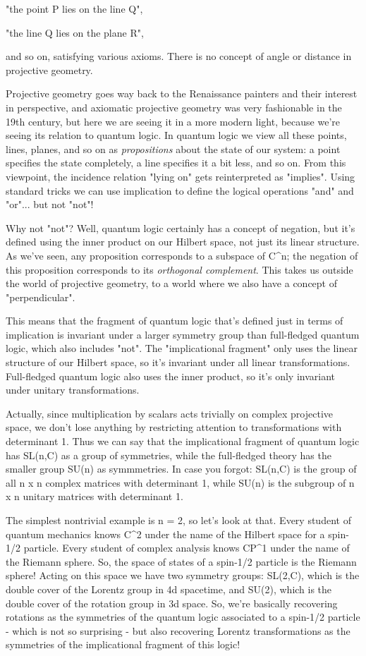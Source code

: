 "the point P lies on the line Q", 

"the line Q lies on the plane R", 

and so on, satisfying various axioms.  There is no concept of angle or
distance in projective geometry.

Projective geometry goes way back to the Renaissance painters and their
interest in perspective, and axiomatic projective geometry was very
fashionable in the 19th century, but here we are seeing it in a more
modern light, because we're seeing its relation to quantum logic.  In
quantum logic we view all these points, lines, planes, and so on as
\emph{propositions} about the state of our system: a point specifies the
state completely, a line specifies it a bit less, and so on.  From this
viewpoint, the incidence relation "lying on" gets
reinterpreted as "implies".  Using standard tricks we can use
implication to define the logical operations "and" and
"or"... but not "not"!


Why not "not"?  Well, quantum logic certainly has a concept of
negation, but it's defined using the inner product on our Hilbert space,
not just its linear structure.  As we've seen, any proposition
corresponds to a subspace of C^{n}; the negation of this
proposition corresponds to its \emph{orthogonal complement}.  This
takes us outside the world of projective geometry, to a world where we
also have a concept of "perpendicular".

This means that the fragment of quantum logic that's defined just in
terms of implication is invariant under a larger symmetry group than
full-fledged quantum logic, which also includes "not".  The
"implicational fragment" only uses the linear structure of our Hilbert
space, so it's invariant under all linear transformations.  Full-fledged 
quantum logic also uses the inner product, so it's only invariant under 
unitary transformations.  

Actually, since multiplication by scalars acts trivially on complex
projective space, we don't lose anything by restricting attention to 
transformations with determinant 1.  Thus we can say that the implicational
fragment of quantum logic has SL(n,C) as a group of symmetries, while
the full-fledged theory has the smaller group SU(n) as symmmetries.
In case you forgot: SL(n,C) is the group of all n x n complex matrices
with determinant 1, while SU(n) is the subgroup of n x n unitary
matrices with determinant 1.  

The simplest nontrivial example is n = 2, so let's look at that.
Every student of quantum mechanics knows C^{2} under the name of the
Hilbert space for a spin-1/2 particle.  Every student of complex
analysis knows CP^{1} under the name of the Riemann sphere.
So, the space of states of a spin-1/2 particle is the Riemann sphere!
Acting on this space we have two symmetry groups: SL(2,C), which is
the double cover of the Lorentz group in 4d spacetime, and SU(2),
which is the double cover of the rotation group in 3d space.  So,
we're basically recovering rotations as the symmetries of the quantum
logic associated to a spin-1/2 particle - which is not so surprising -
but also recovering Lorentz transformations as the symmetries of the
implicational fragment of this logic!

